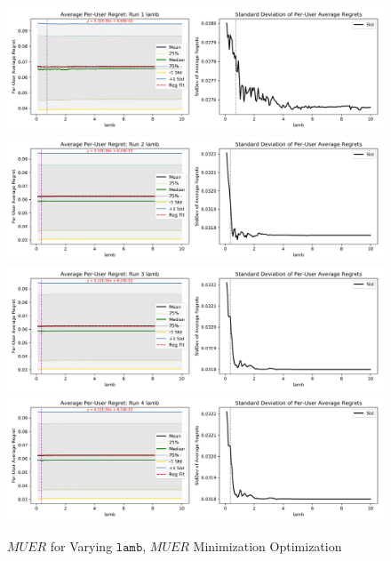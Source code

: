 	\begin{figure}[H]
	\includegraphics[width=1.1\textwidth,center]{figures/opt_param/opt_param_11100_lamb1.png}%
	\newline
	\includegraphics[width=1.1\textwidth,center]{figures/opt_param/opt_param_11100_lamb2.png}%
	\newline
	\includegraphics[width=1.1\textwidth,center]{figures/opt_param/opt_param_11100_lamb3.png}%
	\newline
	\includegraphics[width=1.1\textwidth,center]{figures/opt_param/opt_param_11100_lamb4.png}%
	\caption{$MUER$ for Varying $\mathtt{lamb}$, $MUER$ Minimization Optimization}
	\end{figure}

